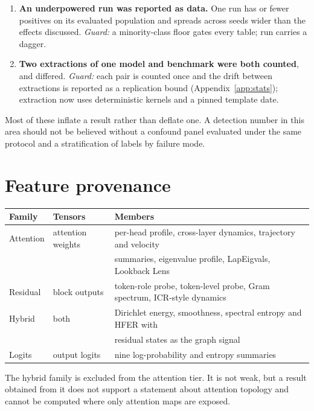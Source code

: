 \begin{enumerate}[topsep=2pt,itemsep=2pt,leftmargin=1.4em]
tool-identity classifier pools at 0.28--0.50 AUC. Its per-fold prediction is a constant, the training base
rate, which is anti-correlated with the held-out fold's rate, so the pooled AUC measures fold composition
and nothing else. \emph{Guard:} the mean of within-fold AUCs and the pooled AUC of the per-fold-constant
predictor are reported beside every pooled score (Appendix~\ref{app:stats}).
\item \textbf{An underpowered run was reported as data.} One run has \minClassPerSubset{} or fewer positives
on its evaluated population and spreads across seeds wider than the effects discussed. \emph{Guard:} a
minority-class floor gates every table; \nUnderpoweredRuns{} run carries a dagger.
\item \textbf{Two extractions of one model and benchmark were both counted}, and differed. \emph{Guard:} each
pair is counted once and the drift between extractions is reported as a replication bound
(Appendix~\ref{app:stats}); extraction now uses deterministic kernels and a pinned template date.
\end{enumerate}

Most of these inflate a result rather than deflate one. A detection number in this area should not be
believed without a confound panel evaluated under the same protocol and a stratification of labels by
failure mode.

\section{Feature provenance}
\label{app:provenance}

\begin{center}
\small
\begin{tabular}{lll}
\toprule
Family & Tensors & Members \\
\midrule
Attention & attention weights & per-head profile, cross-layer dynamics, trajectory and velocity \\
          &                   & summaries, eigenvalue profile, LapEigvals, Lookback Lens \\
Residual  & block outputs     & token-role probe, token-level probe, Gram spectrum, ICR-style dynamics \\
Hybrid    & both              & Dirichlet energy, smoothness, spectral entropy and HFER with \\
          &                   & residual states as the graph signal \\
Logits    & output logits     & nine log-probability and entropy summaries \\
\bottomrule
\end{tabular}
\end{center}
The hybrid family is excluded from the attention tier. It is not weak, but a result obtained from it does not
support a statement about attention topology and cannot be computed where only attention maps are exposed.

